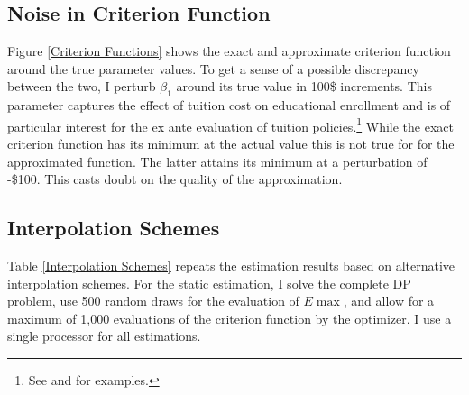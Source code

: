 \subsection{Noise in Criterion Function}\label{Noise in Criterion Function}
Figure \ref{Criterion Functions} shows the exact and approximate criterion function around the true parameter values. To get a sense of a possible discrepancy between the two, I perturb $\beta_1$ around its true value in 100\$ increments. This parameter captures the effect of tuition cost on educational enrollment and is of particular interest for the ex ante evaluation of tuition policies.\footnote{See \citet{Keane.1997} and \citet{Keane.2001} for examples.} While the exact criterion function has its minimum at the actual value this is not true for for the approximated function. The latter attains its minimum at a perturbation of -\$100. This casts doubt on the quality of the approximation.


\subsection{Interpolation Schemes}
Table \ref{Interpolation Schemes} repeats the estimation results based on alternative interpolation schemes. For the static estimation, I solve the complete DP problem, use 500 random draws for the evaluation of $E\max$, and allow for a maximum of 1,000 evaluations of the criterion function by the optimizer. I use a single processor for all estimations.
